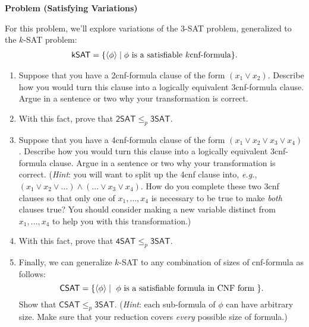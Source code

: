 \documentclass[12pt]{article}
\newcommand{\eg}{\emph{e.g.}\xspace}
\newcommand{\hint}[1]{(\emph{Hint}: #1)}
\newcounter{ProblemCounter}
\newenvironment{problem}[1][]
  {\refstepcounter{ProblemCounter}\noindent\textbf{Problem \theProblemCounter{} (#1)}\quad}
  {\newpage}
\newcommand{\answerbelow}{\noindent\makebox[\linewidth]{\rule{\textwidth}{0.4pt}}}
\newcommand{\prob}[1]{\ensuremath{\mathsf{#1}}\xspace}
\newcommand{\desc}[1]{\ensuremath{\langle #1 \rangle}}
\begin{document}
\begin{problem}[Satisfying Variations]

For this problem, we'll explore variations of the 3-SAT problem, generalized to
the \( k \)-SAT problem:
\begin{gather*}
  \prob{kSAT} = \{ \desc{\phi} \mid \text{\( \phi \) is a satisfiable \( k \)cnf-formula} \}.
\end{gather*}

\begin{enumerate}[itemsep=0pt, label=(\alph*)]
  \item Suppose that you have a 2cnf-formula clause of the form \( (x_1 \vee
    x_2) \). Describe how you would turn this clause into a logically equivalent
    3cnf-formula clause. Argue in a sentence or two why your transformation is
    correct. \item With this fact, prove that \( \prob{2SAT} \leq_p \prob{3SAT}
    \).
  \item Suppose that you have a 4cnf-formula clause of the form \( (x_1 \vee x_2
    \vee x_3 \vee x_4 ) \). Describe how you would turn this clause into a
    logically equivalent 3cnf-formula clause.  Argue in a sentence or two why
    your transformation is correct. \hint{you will want to split up the 4cnf
      clause into, \eg, \( (x_1 \vee x_2 \vee \ldots) \wedge (\ldots \vee x_3
      \vee x_4) \). How do you complete these two 3cnf clauses so that only one
      of \( x_1, \ldots, x_4 \) is necessary to be true to make \emph{both}
      clauses true? You should consider making a new variable distinct from \(
      x_1, \ldots, x_4 \) to help you with this transformation.}
  \item With this fact, prove that \( \prob{4SAT} \leq_p \prob{3SAT} \).
  \item Finally, we can generalize \( k \)-SAT to any combination of sizes of
    cnf-formula as follows:
    \[
      \prob{CSAT} = \{ \desc{\phi} \mid \text{ \( \phi \) is a satisfiable
        formula in CNF form } \}.
    \]
    Show that \( \prob{CSAT} \leq_p \prob{3SAT} \).  \hint{each sub-formula of
    \( \phi \) can have arbitrary size.  Make sure that your reduction covers
    \emph{every} possible size of formula.}
\end{enumerate}

\answerbelow{}


\end{problem}

\end{document}
